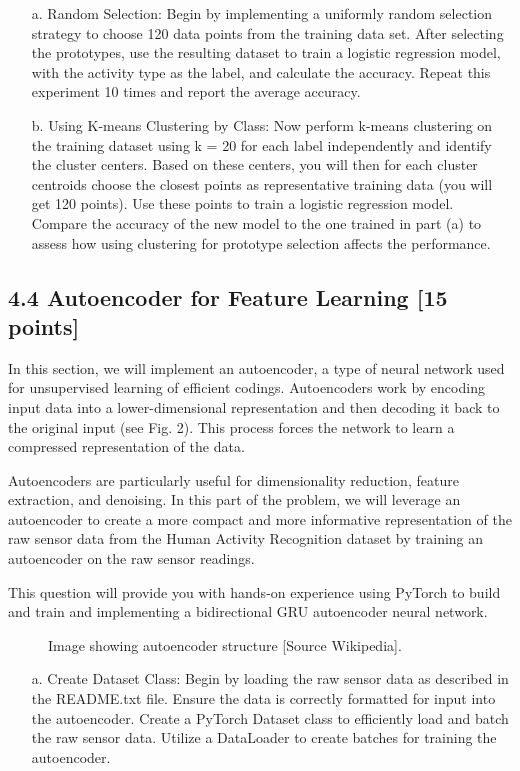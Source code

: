 \documentclass[a3paper,12pt]{extarticle} %
\begin{document}
\begin{enumerate}
\begin{itemize}
\item[a.] Random Selection: Begin by implementing a uniformly random selection strategy to choose 120 data points from the training data set. After selecting the prototypes, use the resulting dataset to train a logistic regression model, with the activity type as the label, and calculate the accuracy. Repeat this experiment 10 times and report the average accuracy.

\item[b.] Using K-means Clustering by Class: Now perform k-means clustering on the training dataset using k = 20 for each label independently and identify the cluster centers. Based on these centers, you will then for each cluster centroids choose the closest points as representative training data (you will get 120 points). Use these points to train a logistic regression model. Compare the accuracy of the new model to the one trained in part (a) to assess how using clustering for prototype selection affects the performance.
\end{itemize}

\subsection*{4.4 Autoencoder for Feature Learning [15 points]}
In this section, we will implement an autoencoder, a type of neural network used for unsupervised learning of efficient codings. Autoencoders work by encoding input data into a lower-dimensional representation and then decoding it back to the original input (see Fig. 2). This process forces the network to learn a compressed representation of the data.

Autoencoders are particularly useful for dimensionality reduction, feature extraction, and denoising. In this part of the problem, we will leverage an autoencoder to create a more compact and more informative representation of the raw sensor data from the Human Activity Recognition dataset by training an autoencoder on the raw sensor readings.

This question will provide you with hands-on experience using PyTorch to build and train and implementing a bidirectional GRU autoencoder neural network.

\begin{figure}[h]
\centering
\caption{Image showing autoencoder structure [Source Wikipedia].}
\end{figure}

\begin{itemize}
\item[a.] Create Dataset Class: Begin by loading the raw sensor data as described in the README.txt file. Ensure the data is correctly formatted for input into the autoencoder. Create a PyTorch Dataset class to efficiently load and batch the raw sensor data. Utilize a DataLoader to create batches for training the autoencoder.


\end{itemize}
\end{enumerate}
\end{document}
